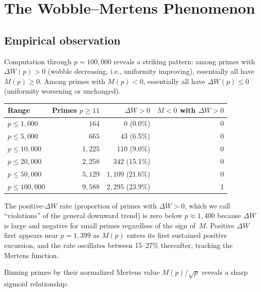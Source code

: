 \documentclass[11pt]{article}
\theoremstyle{definition}
\begin{document}
\section{The Wobble--Mertens Phenomenon}\label{sec:phenomenon}

\subsection{Empirical observation}

Computation through $p = 100{,}000$ reveals a striking pattern:
among primes with $\Delta W(p) > 0$ (wobble decreasing, i.e.,
uniformity improving), essentially all have $M(p) \ge 0$.  Among
primes with $M(p) < 0$, essentially all have $\Delta W(p) \le 0$
(uniformity worsening or unchanged).

\begin{center}
\begin{tabular}{lrrr}
\toprule
Range & Primes $p \ge 11$ & $\Delta W > 0$ & $M < 0$ with $\Delta W > 0$ \\
\midrule
$p \le 1{,}000$ & $164$ & $0$ (0.0\%) & 0 \\
$p \le 5{,}000$ & $665$ & $43$ (6.5\%) & 0 \\
$p \le 10{,}000$ & $1{,}225$ & $110$ (9.0\%) & 0 \\
$p \le 20{,}000$ & $2{,}258$ & $342$ (15.1\%) & 0 \\
$p \le 50{,}000$ & $5{,}129$ & $1{,}109$ (21.6\%) & 0 \\
$p \le 100{,}000$ & $9{,}588$ & $2{,}295$ (23.9\%) & 1 \\
\bottomrule
\end{tabular}
\end{center}

\noindent The positive-$\Delta W$ rate (proportion of primes with
$\Delta W > 0$, which we call ``violations'' of the general
downward trend) is zero below $p \approx 1{,}400$ because
$\Delta W$ is large and negative for small primes regardless
of the sign of~$M$.  Positive $\Delta W$ first appears near
$p = 1{,}399$ as $M(p)$ enters
its first sustained positive excursion, and the rate oscillates
between 15--27\% thereafter, tracking the Mertens function.

Binning primes by their normalized Mertens value $M(p)/\sqrt{p}$
reveals a sharp sigmoid relationship:
\end{document}
